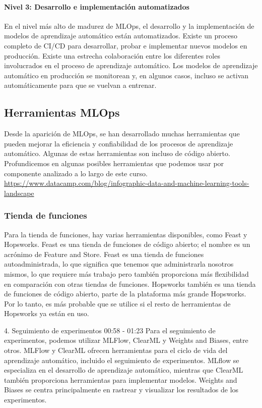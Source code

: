 \documentclass[10pt]{book}
\begin{document}
\paragraph{Nivel 3: Desarrollo e implementación automatizados}
En el nivel más alto de madurez de MLOps, el desarrollo y la implementación de modelos de aprendizaje automático están automatizados. Existe un proceso completo de CI/CD para desarrollar, probar e implementar nuevos modelos en producción. Existe una estrecha colaboración entre los diferentes roles involucrados en el proceso de aprendizaje automático. Los modelos de aprendizaje automático en producción se monitorean y, en algunos casos, incluso se activan automáticamente para que se vuelvan a entrenar.


\subsection{Herramientas MLOps}
Desde la aparición de MLOps, se han desarrollado muchas herramientas que pueden mejorar la eficiencia y confiabilidad de los procesos de aprendizaje automático. Algunas de estas herramientas son incluso de código abierto. Profundicemos en algunas posibles herramientas que podemos usar por componente analizado a lo largo de este curso.
\url{https://www.datacamp.com/blog/infographic-data-and-machine-learning-tools-landscape}


\subsubsection{Tienda de funciones}
Para la tienda de funciones, hay varias herramientas disponibles, como Feast y Hopsworks. Feast es una tienda de funciones de código abierto; el nombre es un acrónimo de Feature and Store. Feast es una tienda de funciones autoadministrada, lo que significa que tenemos que administrarla nosotros mismos, lo que requiere más trabajo pero también proporciona más flexibilidad en comparación con otras tiendas de funciones. Hopsworks también es una tienda de funciones de código abierto, parte de la plataforma más grande Hopsworks. Por lo tanto, es más probable que se utilice si el resto de herramientas de Hopsworks ya están en uso.

4. Seguimiento de experimentos
00:58 - 01:23
Para el seguimiento de experimentos, podemos utilizar MLFlow, ClearML y Weights and Biases, entre otros. MLFlow y ClearML ofrecen herramientas para el ciclo de vida del aprendizaje automático, incluido el seguimiento de experimentos. MLflow se especializa en el desarrollo de aprendizaje automático, mientras que ClearML también proporciona herramientas para implementar modelos. Weights and Biases se centra principalmente en rastrear y visualizar los resultados de los experimentos.
\end{document}
